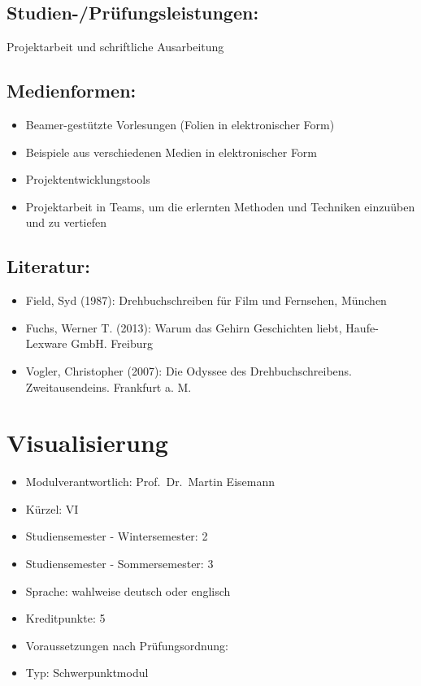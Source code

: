 \section*{Studien-/Prüfungsleistungen:}\label{studien-pruxfcfungsleistungen-17}

Projektarbeit und schriftliche Ausarbeitung

\section*{Medienformen:}\label{medienformen-17}

\begin{itemize}
\tightlist
\item
  Beamer-gestützte Vorlesungen (Folien in elektronischer Form)
\item
  Beispiele aus verschiedenen Medien in elektronischer Form
\item
  Projektentwicklungstools
\item
  Projektarbeit in Teams, um die erlernten Methoden und Techniken
  einzuüben und zu vertiefen
\end{itemize}

\section*{Literatur:}\label{literatur-14}

\begin{itemize}
\tightlist
\item
  Field, Syd (1987): Drehbuchschreiben für Film und Fernsehen, München
\item
  Fuchs, Werner T. (2013): Warum das Gehirn Geschichten liebt,
  Haufe-Lexware GmbH. Freiburg
\item
  Vogler, Christopher (2007): Die Odyssee des Drehbuchschreibens.
  Zweitausendeins. Frankfurt a. M.
\end{itemize}

\chapter{Visualisierung}\label{visualisierung}

\begin{itemize}
\tightlist
\item
  Modulverantwortlich: Prof.~Dr.~Martin Eisemann
\item
  Kürzel: VI
\item
  Studiensemester - Wintersemester: 2
\item
  Studiensemester - Sommersemester: 3
\item
  Sprache: wahlweise deutsch oder englisch
\item
  Kreditpunkte: 5
\item
  Voraussetzungen nach Prüfungsordnung: ~
\item
  Typ: Schwerpunktmodul
\end{itemize}

